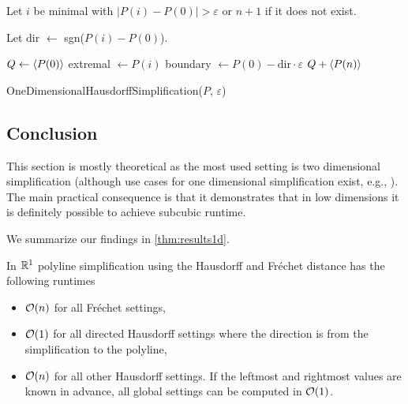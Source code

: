\begin{algorithm}[htb]
  \DontPrintSemicolon
  \BlankLine
	Let \(i\) be minimal with \(|P(i)-P(0)| > \varepsilon\) or \(n+1\) if it does not exist. 

	Let dir \(\gets\) sgn(\(P(i)-P(0)\)).

	\(Q \gets \left\langle P(0)\right\rangle\)\;
	extremal \(\gets P(i)\)\;
	boundary \(\gets P(0) -\textrm{dir} \cdot \varepsilon\)\;
	\Return \(Q + \left\langle P(n)\right\rangle\)
	\caption{OneDimensionalHausdorffSimplification(\(P\), \(\varepsilon\))}
  \label{algo:hausdorff1d}
\end{algorithm}
\subsection{Conclusion}
This section is mostly theoretical as the most used setting is two dimensional simplification (although use cases for one dimensional simplification exist, e.g., \citeauthor{clustering_time_series}). The main practical consequence is that it demonstrates that in low dimensions it is definitely possible to achieve subcubic runtime.

We summarize our findings in \cref{thm:results1d}.
\begin{theorem}\label{thm:results1d}
  In \(\mathbb{R}^1\) polyline simplification using the Hausdorff and Fréchet distance has the following runtimes
	\begin{itemize}
		\item \(\mathcal{O}(n)\) for all Fréchet settings,
		\item \(\mathcal{O}(1)\) for all directed Hausdorff settings where the direction is from the simplification to the polyline,
		\item \(\mathcal{O}(n)\) for all other Hausdorff settings. If the leftmost and rightmost values are known in advance, all global settings can be computed in \(\mathcal{O}(1)\).
	\end{itemize}
\end{theorem}


